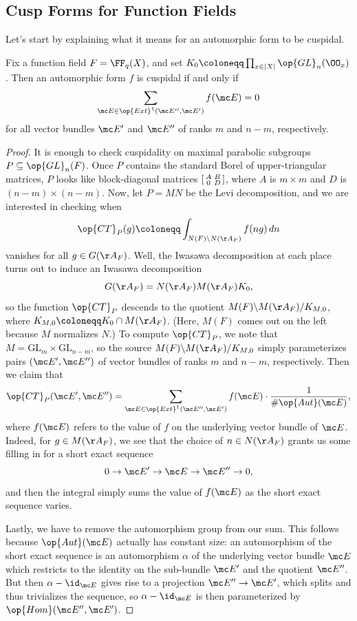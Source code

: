 \documentclass[../notes.tex]{subfiles}
\begin{document}
\subsection{Cusp Forms for Function Fields}
Let's start by explaining what it means for an automorphic form to be cuspidal.
\begin{lemma}
	Fix a function field $F=\FF_q(X)$, and set $K_0\coloneqq\prod_{x\in\left|X\right|}\op{GL}_n(\OO_x)$. Then an automorphic form $f$ is cuspidal if and only if
	\[\sum_{\mc E\in\op{Ext}^1(\mc E'',\mc E')}f(\mc E)=0\]
	for all vector bundles $\mc E'$ and $\mc E''$ of ranks $m$ and $n-m$, respectively.
\end{lemma}
\begin{proof}
	It is enough to check cuspidality on maximal parabolic subgroups $P\subseteq\op{GL}_n(F)$. Once $P$ contains the standard Borel of upper-triangular matrices, $P$ looks like block-diagonal matrices $\begin{bsmallmatrix}
		A & B \\ 0 & D
	\end{bsmallmatrix}$, where $A$ is $m\times m$ and $D$ is $(n-m)\times(n-m)$. Now, let $P=MN$ be the Levi decomposition, and we are interested in checking when
	\[\op{CT}_P(g)\coloneqq\int_{N(F)\backslash N(\AA_F)}f(ng)\,dn\]
	vanishes for all $g\in G(\AA_F)$. Well, the Iwasawa decomposition at each place turns out to induce an Iwasawa decomposition
	\[G(\AA_F)=N(\AA_F)M(\AA_F)K_0,\]
	so the function $\op{CT}_P$ descends to the quotient $M(F)\backslash M(\AA_F)/K_{M,0}$, where $K_{M,0}\coloneqq K_0\cap M(\AA_F)$. (Here, $M(F)$ comes out on the left because $M$ normalizes $N$.) To compute $\op{CT}_P$, we note that $M=\mathrm{GL}_m\times\mathrm{GL}_{n-m}$, so the source $M(F)\backslash M(\AA_F)/K_{M,0}$ simply parameterizes pairs $(\mc E',\mc E'')$ of vector bundles of ranks $m$ and $n-m$, respectively. Then we claim that
	\[\op{CT}_P(\mc E',\mc E'')=\sum_{\mc E\in\op{Ext}^1(\mc E'',\mc E')}f(\mc E)\cdot\frac1{\#\op{Aut}(\mc E)},\]
	where $f(\mc E)$ refers to the value of $f$ on the underlying vector bundle of $\mc E$. Indeed, for $g\in M(\AA_F)$, we see that the choice of $n\in N(\AA_F)$ grants us some filling in for a short exact sequence
	\[0\to\mc E'\to\mc E\to\mc E''\to0,\]
	and then the integral simply sums the value of $f(\mc E)$ as the short exact sequence varies.
	
	Lastly, we have to remove the automorphism group from our sum. This follows because $\op{Aut}(\mc E)$ actually has constant size: an automorphism of the short exact sequence is an automorphism $\alpha$ of the underlying vector bundle $\mc E$ which restricts to the identity on the sub-bundle $\mc E'$ and the quotient $\mc E''$. But then $\alpha-\id_{\mc E}$ gives rise to a projection $\mc E''\to\mc E'$, which splits and thus trivializes the sequence, so $\alpha-\id_{\mc E}$ is then parameterized by $\op{Hom}(\mc E'',\mc E')$.
\end{proof}
\end{document}
